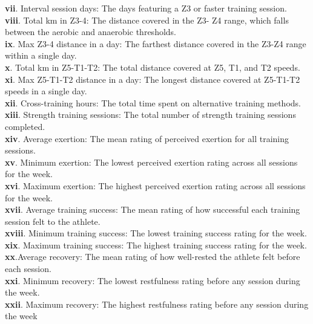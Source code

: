 \documentclass[12pt, English]{article}
\begin{document}
\begin{normalsize}
\textbf{vii}. Interval session days: The days featuring a Z3 or faster training session.\\
\textbf{viii}. Total km in Z3-4: The distance covered in the Z3- Z4 range, which falls between the aerobic and anaerobic thresholds.\\
\textbf{ix}. Max Z3-4 distance in a day: The farthest distance covered in the Z3-Z4 range within a single day.\\
\textbf{x}.	Total km in Z5-T1-T2: The total distance covered at Z5, T1, and T2 speeds.\\
\textbf{xi}. Max Z5-T1-T2 distance in a day: The longest distance covered at Z5-T1-T2 speeds in a single day.\\
\textbf{xii}. Cross-training hours: The total time spent on alternative training methods.\\
\textbf{xiii}. Strength training sessions: The total number of strength training sessions completed.\\
\textbf{xiv}. Average exertion: The mean rating of perceived exertion for all training sessions.\\
\textbf{xv}. Minimum exertion: The lowest perceived exertion rating across all sessions for the week.\\
\textbf{xvi}. Maximum exertion: The highest perceived exertion rating across all sessions for the week.\\
\textbf{xvii}. Average training success: The mean rating of how successful each training session felt to the athlete.\\
\textbf{xviii}. Minimum training success: The lowest training success rating for the week.\\
\textbf{xix}. Maximum training success: The highest training success rating for the week.\\
\textbf{xx}.Average recovery: The mean rating of how well-rested the athlete felt before each session.\\
\textbf{xxi}. Minimum recovery: The lowest restfulness rating before any session during the week.\\
\textbf{xxii}. Maximum recovery: The highest restfulness rating before any session during the week



\end{normalsize}
\end{document}

